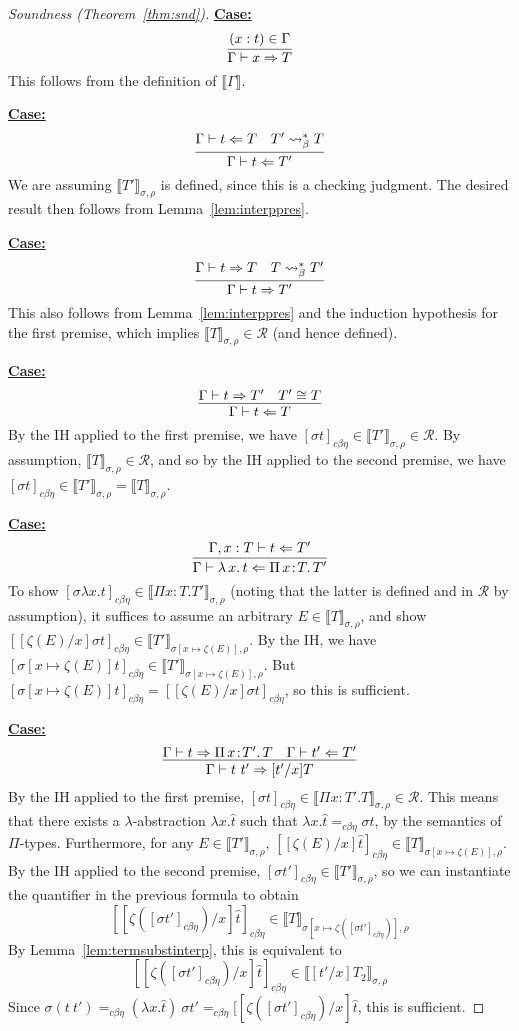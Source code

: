 \documentclass{article}
\newcommand{\choice}[0]{\zeta}
\newcommand{\abs}[4]{{#1}\, #2\! : \! #3.\, #4}
\newcommand{\absu}[3]{{#1}\, #2.\, #3}
\newcommand{\interp}[1]{\llbracket #1 \rrbracket}
\newcommand{\tpcheck}[0]{\Leftarrow}
\newcommand{\tpsynth}[0]{\Rightarrow}
\newcommand{\cbe}[0]{c\beta\eta}
\newcommand{\startcase}[1]{\vspace{#1} \noindent\textbf{\underline{Case:}}}
\begin{document}
\begin{proof}[Soundness (Theorem~\ref{thm:snd})]
\startcase{.2cm}
\[
    \infer{\Gamma\vdash x\tpsynth T}{(x : t)\in\Gamma} 
\]
This follows from the definition of $\interp{\Gamma}$.

\startcase{.2cm}
\[
 \infer{\Gamma\vdash t\tpcheck T'}{\Gamma\vdash t \tpcheck T & T' \leadsto^*_\beta T} 
\]
We are assuming $\interp{T'}_{\sigma,\rho}$ is defined, since this is a checking judgment. The desired result then
follows from Lemma~\ref{lem:interppres}.

\startcase{.2cm}
\[
    \infer{\Gamma\vdash t\tpsynth T'}{\Gamma\vdash t \tpsynth T & T \leadsto^*_\beta T'} 
\]
This also follows from Lemma~\ref{lem:interppres} and the induction hypothesis for the first premise,
which implies $\interp{T}_{\sigma,\rho}\in\mathcal{R}$ (and hence defined).

\startcase{.2cm}
\[
\infer{\Gamma\vdash t\tpcheck T}{\Gamma\vdash t\tpsynth T' & T' \cong T} 
\]
By the IH applied to the first premise, we have 
$[\sigma t]_{\cbe}\in\interp{T'}_{\sigma,\rho}\in\mathcal{R}$. By assumption, $\interp{T}_{\sigma,\rho}\in\mathcal{R}$,
and so by the IH applied to the second premise, we have $[\sigma t]_{\cbe}\in\interp{T'}_{\sigma,\rho} = \interp{T}_{\sigma,\rho}$.


\startcase{.2cm}
\[
    \infer{\Gamma\vdash \absu{\lambda}{x}{t} \tpcheck \abs{\Pi}{x}{T}{T'}}{\Gamma,x:T\vdash t\tpcheck T'} 
\]
To show $[\sigma \lambda x.t]_{\cbe}\in\interp{\Pi  x:T.T'}_{\sigma,\rho}$ (noting that the latter is defined
and in $\mathcal{R}$ by assumption), it suffices to assume an arbitrary
$E\in\interp{T}_{\sigma,\rho}$, and show
$[[\choice(E)/x]\sigma t]_{\cbe}\in\interp{T'}_{\sigma[x\mapsto\choice(E)],\rho}$.  By the IH,
we have
$[\sigma[x\mapsto\choice(E)]t]_{\cbe}\in\interp{T'}_{\sigma[x\mapsto\choice(E)],\rho}$.
But $[\sigma[x\mapsto\choice(E)]t]_{\cbe} = [[\choice(E)/x]\sigma t]_{\cbe}$,
so this is sufficient.

\startcase{.2cm}
\[
    \infer{\Gamma\vdash t\ t' \tpsynth [t'/x]T}{\Gamma\vdash t \tpsynth \abs{\Pi}{x}{T'}{T} & \Gamma\vdash t' \tpcheck T'} 
\]
By the IH applied to the first premise, $[\sigma
t]_{\cbe}\in\interp{\Pi x:T'.T}_{\sigma,\rho}\in\mathcal{R}$.  This
means that there exists a $\lambda$-abstraction $\lambda x.\hat{t}$
such that $\lambda x.\hat{t} =_{\cbe} \sigma t$, by the semantics of $\Pi$-types.
Furthermore, for any $E\in\interp{T'}_{\sigma,\rho}$,
$[[\choice(E)/x]\hat{t}]_{\cbe}\in\interp{T}_{\sigma[x\mapsto\choice(E)],\rho}$.
By the IH applied to the second premise, $[\sigma t']_{\cbe}\in\interp{T'}_{\sigma,\rho}$,
so we can instantiate the quantifier in the previous formula to obtain
\[
 [[\choice([\sigma t']_{\cbe})/x]\hat{t}]_{\cbe}\in\interp{T}_{\sigma[x\mapsto\choice([\sigma t']_{\cbe})],\rho}
\]
By Lemma~\ref{lem:termsubstinterp}, this is equivalent to
\[
 [[\choice([\sigma t']_{\cbe})/x]\hat{t}]_{\cbe}\in\interp{[t'/x]T_2}_{\sigma,\rho}
\]
Since $\sigma (t\ t') =_{\cbe} (\lambda x.\hat{t})\ \sigma t' =_{\cbe} [[\choice([\sigma t']_{\cbe})/x]\hat{t}$,
this is sufficient.


\end{proof}
\end{document}
